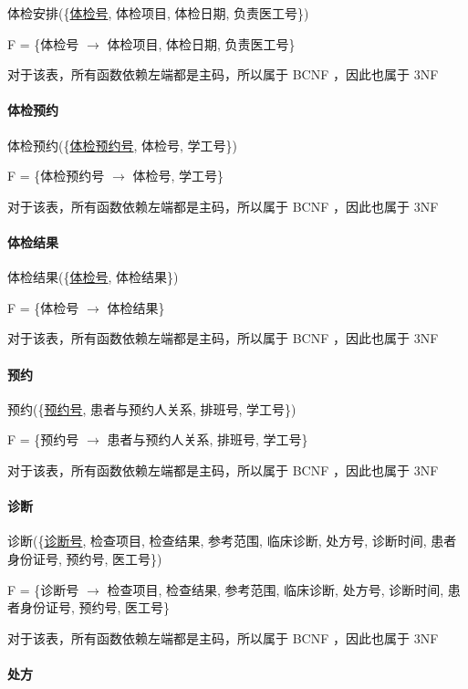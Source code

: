\documentclass{article}
\begin{document}
体检安排(\{\underline{体检号}, 体检项目, 体检日期, 负责医工号\})

F = \{体检号 $\rightarrow$ 体检项目, 体检日期, 负责医工号\}

对于该表，所有函数依赖左端都是主码，所以属于 BCNF ，因此也属于 3NF

\paragraph{体检预约}

体检预约(\{\underline{体检预约号}, 体检号, 学工号\})

F = \{体检预约号 $\rightarrow$ 体检号, 学工号\}

对于该表，所有函数依赖左端都是主码，所以属于 BCNF ，因此也属于 3NF

\paragraph{体检结果}

体检结果(\{\underline{体检号}, 体检结果\})

F = \{体检号 $\rightarrow$ 体检结果\}

对于该表，所有函数依赖左端都是主码，所以属于 BCNF ，因此也属于 3NF

\paragraph{预约}

预约(\{\underline{预约号}, 患者与预约人关系, 排班号, 学工号\})

F = \{预约号 $\rightarrow$ 患者与预约人关系, 排班号, 学工号\}

对于该表，所有函数依赖左端都是主码，所以属于 BCNF ，因此也属于 3NF

\paragraph{诊断}

诊断(\{\underline{诊断号}, 检查项目, 检查结果, 参考范围, 临床诊断, 处方号, 诊断时间, 患者身份证号, 预约号, 医工号\})

F = \{诊断号 $\rightarrow$ 检查项目, 检查结果, 参考范围, 临床诊断, 处方号, 诊断时间, 患者身份证号, 预约号, 医工号\}

对于该表，所有函数依赖左端都是主码，所以属于 BCNF ，因此也属于 3NF

\paragraph{处方}
\end{document}
